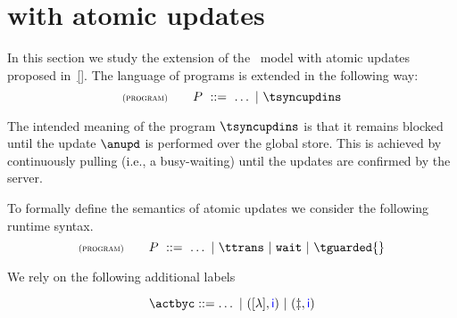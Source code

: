 
\section{{\gsp} with atomic updates}
\label{sec:transactions}

In this section we study the extension of the \gsp\ model with atomic updates proposed in~\ref{}. 
The language of programs is extended in the following way: 
\[
 \rName{program} 
			 \qquad 
			 \tprogram \ ::=\  \ldots\ |\ \tsyncupdins 
\]

The intended meaning of the program  $\tsyncupdins$ is that it remains blocked until the 
update $\anupd$ is performed over the global store.  This is achieved by continuously pulling (i.e., 
a busy-waiting) until the updates are confirmed by the server. 

To formally define the semantics of atomic updates we consider the following 
runtime syntax.
\[
 \rName{program} 
			 \qquad 
			 \tprogram \ ::=\  \ldots\ |\  \ttrans\ |\ \waitcmd \ |\ \tguarded{} 
			 \]

We rely  on the following additional labels
			 
\[  \actbyc ::= \ldots \ |\ ([\lambda],\cid)\  |\ (\finishsynctran,\cid)
\]

